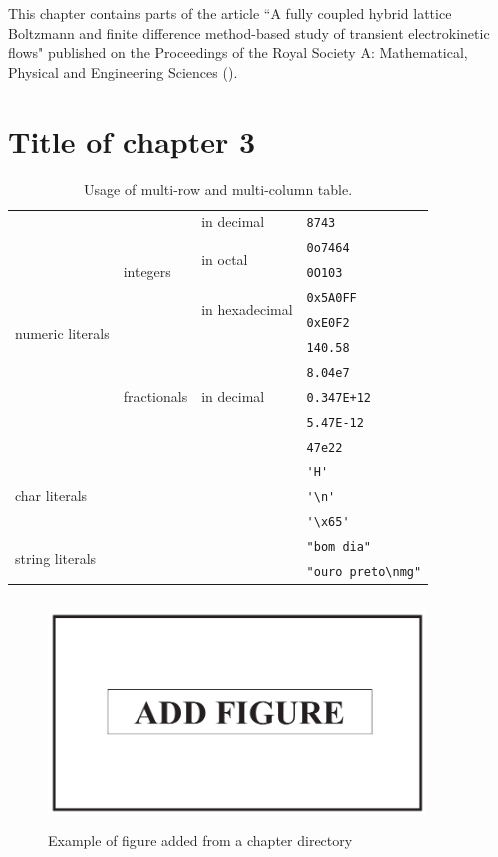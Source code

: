 \begin{savequote}[0.75\linewidth]
	This chapter contains parts of the article ``A fully coupled hybrid lattice Boltzmann and finite difference method-based study of transient electrokinetic flows" published on the Proceedings of the Royal Society A: Mathematical, Physical and Engineering Sciences (\cite{Basu-2020A}).
	\qauthor{}
\end{savequote}

\chapter{Title of chapter 3}
\graphicspath{{30_Chapter_3/figures/}}
\lipsum[1-2]

\begin{table}[ht]
    \centering
    \caption{\label{tab:sample_table}\small Usage of multi-row and multi-column table.}
\begin{tabular}{|l|l|l|l|}\hline
  \multirow{10}{*}{numeric literals} & \multirow{5}{*}{integers} & in decimal & \verb|8743| \\ \cline{3-4}
  & & \multirow{2}{*}{in octal} & \verb|0o7464| \\ \cline{4-4}
  & & & \verb|0O103| \\ \cline{3-4}
  & & \multirow{2}{*}{in hexadecimal} & \verb|0x5A0FF| \\ \cline{4-4}
  & & & \verb|0xE0F2| \\ \cline{2-4}
  & \multirow{5}{*}{fractionals} & \multirow{5}{*}{in decimal} & \verb|140.58| \\ \cline{4-4}
  & & & \verb|8.04e7| \\ \cline{4-4}
  & & & \verb|0.347E+12| \\ \cline{4-4}
  & & & \verb|5.47E-12| \\ \cline{4-4}
  & & & \verb|47e22| \\ \cline{1-4}
  \multicolumn{3}{|l|}{\multirow{3}{*}{char literals}} & \verb|'H'| \\ \cline{4-4}
  \multicolumn{3}{|l|}{} & \verb|'\n'| \\ \cline{4-4}          %
  \multicolumn{3}{|l|}{} & \verb|'\x65'| \\ \cline{1-4}        %
  \multicolumn{3}{|l|}{\multirow{2}{*}{string literals}} & \verb|"bom dia"| \\ \cline{4-4}
  \multicolumn{3}{|l|}{} & \verb|"ouro preto\nmg"| \\ \cline{1-4}          %
\end{tabular}
\end{table}

\lipsum[3]

\begin{figure}
	\centering
	\includegraphics[width=10cm,height=6cm]{Figure-eps-converted-to}
	\caption{Example of figure added from a chapter directory}
	\label{fig:Figure-eps-converted-to}
\end{figure}

